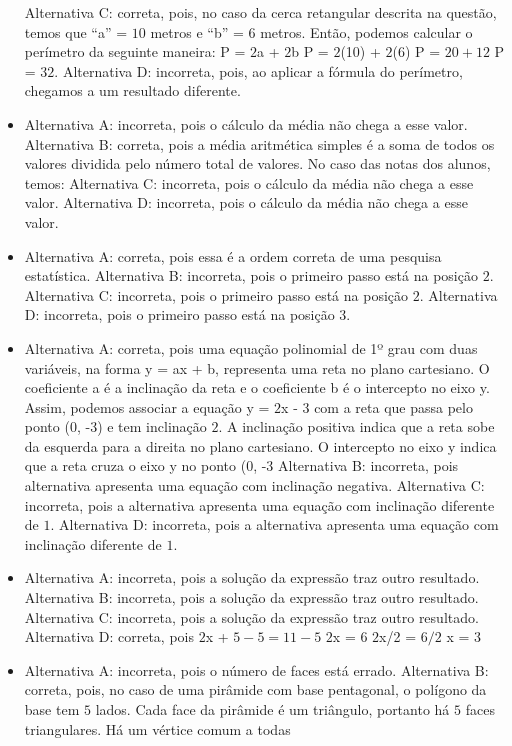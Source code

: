 \begin{itemize}
Alternativa C: correta, pois, no caso da cerca retangular descrita na
questão, temos que ``a'' = $10$ metros e ``b'' = $6$ metros. Então, podemos
calcular o perímetro da seguinte maneira: P = $2$a + $2$b P = $2$(10) + $2$(6) P = $20 + 12$ P = $32$.
Alternativa D: incorreta, pois, ao aplicar a fórmula do perímetro,
chegamos a um resultado diferente.
\item Alternativa A: incorreta, pois o cálculo da média não chega a esse
valor.
Alternativa B: correta, pois a média aritmética simples é a soma de
todos os valores dividida pelo número total de valores. No caso das
notas dos alunos, temos:
Alternativa C: incorreta, pois o cálculo da média não chega a esse
valor.
Alternativa D: incorreta, pois o cálculo da média não chega a esse
valor.
\item Alternativa A: correta, pois essa é a ordem correta de uma pesquisa
estatística.
Alternativa B: incorreta, pois o primeiro passo está na posição $2$.
Alternativa C: incorreta, pois o primeiro passo está na posição $2$.
Alternativa D: incorreta, pois o primeiro passo está na posição $3$.
\item Alternativa A: correta, pois uma equação polinomial de 1º grau com duas
variáveis, na forma y = ax + b, representa uma reta no plano cartesiano.
O coeficiente a é a inclinação da reta e o coeficiente b é o intercepto
no eixo y. Assim, podemos associar a equação y = $2$x - $3$ com a reta que
passa pelo ponto (0, -3) e tem inclinação $2$. A inclinação positiva
indica que a reta sobe da esquerda para a direita no plano cartesiano. O
intercepto no eixo y indica que a reta cruza o eixo y no ponto (0, -3
Alternativa B: incorreta, pois alternativa apresenta uma equação com
inclinação negativa.
Alternativa C: incorreta, pois a alternativa apresenta uma equação com
inclinação diferente de $1$.
Alternativa D: incorreta, pois a alternativa apresenta uma equação com
inclinação diferente de $1$.
\item Alternativa A: incorreta, pois a solução da expressão traz outro
resultado.
Alternativa B: incorreta, pois a solução da expressão traz outro
resultado.
Alternativa C: incorreta, pois a solução da expressão traz outro
resultado.
Alternativa D: correta, pois $2$x + $5 - 5 = 11 - 5$ $2$x = $6$ $2$x/2 = $6/2$ x = $3$
\item Alternativa A: incorreta, pois o número de faces está errado.
Alternativa B: correta, pois, no caso de uma pirâmide com base
pentagonal, o polígono da base tem $5$ lados. Cada face da pirâmide é um
triângulo, portanto há $5$ faces triangulares. Há um vértice comum a todas

\end{itemize}
